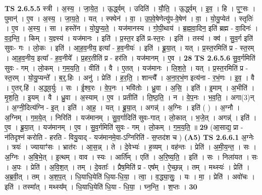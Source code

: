\documentclass[17pt]{extarticle}
\begin{document}
                  \newline
                                \textbf{ TS 2.6.5.5} \newline
                  स्त्री । अ॒स्य॒ । जा॒ये॒त॒ । ऊ॒र्द्ध्वम् । उदिति॑ । यौ॒ति॒ । ऊ॒र्द्ध्वम् । इ॒व॒ । हि । पुꣳ॒॒सः । पुमान्॑ । ए॒व । अ॒स्य॒ । जा॒य॒ते॒ । यत् । स्फ्येन॑ । वा॒ । उ॒प॒वे॒षेणेत्यु॑प-वे॒षेण॑ । वा॒ । यो॒यु॒प्येत॑ । स्तृतिः॑ । ए॒व । अ॒स्य॒ । सा । हस्ते॑न । यो॒यु॒प्य॒ते॒ । यज॑मानस्य । गो॒पी॒थाय॑ । ब्र॒ह्म॒वा॒दिन॒ इति॑ ब्रह्म - वा॒दिनः॑ । व॒द॒न्ति॒ । किम् । य॒ज्ञ्स्य॑ । यज॑मानः । इति॑ । प्र॒स्त॒र इति॑ प्र-स्त॒रः । इति॑ । तस्य॑ । क्व॑ । सु॒व॒र्ग इति॑ सुवः- गः । लो॒कः । इति॑ । आ॒ह॒व॒नीय॒ इत्या᳚ - ह॒व॒नीयः॑ । इति॑ । ब्रू॒या॒त् । यत् । प्र॒स्त॒रमिति॑ प्र - स्त॒रम् । आ॒ह॒व॒नीय॒ इत्या᳚ - ह॒व॒नीये᳚ । प्र॒हर॒तीति॑ प्र - हर॑ति । यज॑मानम् । ए॒व । \textbf{  28} \newline
                  \newline
                                \textbf{ TS 2.6.5.6} \newline
                  सु॒व॒र्गमिति॑ सुवः - गम् । लो॒कम् । ग॒म॒य॒ति॒ । वीति॑ । वै । ए॒तत् । यज॑मानः । लि॒श॒ते॒ । यत् । प्र॒स्त॒रमिति॑ प्र - स्त॒रम् । यो॒यु॒प्यन्ते᳚ । ब॒र्॒.हिः । अनु॑ । प्रेति॑ । ह॒र॒ति॒ । शान्त्यै᳚ । अ॒ना॒र॒भं॒ण इत्य॑ना - र॒भं॒णः । इ॒व॒ । वै । ए॒तर्.हि॑ । अ॒द्ध्व॒र्युः । सः । ई॒श्व॒रः । वे॒प॒नः । भवि॑तोः । ध्रु॒वा । अ॒सि॒ । इति॑ । इ॒माम् । अ॒भीति॑ । मृ॒श॒ति॒ । इ॒यम् । वै । ध्रु॒वा । अ॒स्याम् । ए॒व । प्रतीति॑ । ति॒ष्ठ॒ति॒ । न । वे॒प॒नः । भ॒व॒ति॒ । अगा(3)न् । अ॒ग्नी॒दित्य॑ग्नि - इ॒त् । इति॑ । आ॒ह॒ । यत् । ब्रू॒या॒त् । अगन्न्॑ । अ॒ग्निः । इति॑ ( ) । अ॒ग्नौ । अ॒ग्निम् । ग॒म॒ये॒त् । निरिति॑ । यज॑मानम् । सु॒व॒र्गादिति॑ सुवः-गात् । लो॒कात् । भ॒जे॒त् । अगन्न्॑ । इति॑ । ए॒व । ब्रू॒या॒त् । यज॑मानम् । ए॒व । सु॒व॒र्गमिति॑ सुवः - गम् । लो॒कम् । ग॒म॒य॒ति॒ ॥ \textbf{  29} \newline
                  \newline
                      (आ॒साद्य॒ प्रा - न॑तिदृश्नं करोति - हरति - वियु॒याद् - यज॑मानमे॒वा-ऽग्निरिति॑ - स॒प्तद॑श च )  \textbf{(A5)} \newline \newline
                                \textbf{ TS 2.6.6.1} \newline
                  अ॒ग्नेः । त्रयः॑ । ज्यायाꣳ॑सः । भ्रात॑रः । आ॒स॒न्न् । ते । दे॒वेभ्यः॑ । ह॒व्यम् । वह॑न्तः । प्रेति॑ । अ॒मी॒य॒न्त॒ । सः । अ॒ग्निः । अ॒बि॒भे॒त् । इ॒त्थम् । वाव । स्यः । आर्ति᳚म् । एति॑ । अ॒रि॒ष्य॒ति॒ । इति॑ । सः । निला॑यत । सः । अ॒पः । प्रेति॑ । अ॒वि॒श॒त् । तम् । दे॒वताः᳚ । प्रैष॒मिति॑ प्र - एष᳚म् । ऐ॒च्छ॒न्न् । तम् । मथ्स्यः॑ । प्रेति॑ । अ॒ब्र॒वी॒त् । तम् । अ॒श॒प॒त् । धि॒याधि॒येति॑ धि॒या-धि॒या॒ । त्वा॒ । व॒द्ध्या॒सुः॒ । यः । मा॒ । प्रेति॑ । अवो॑चः । इति॑ । तस्मा᳚त् । मथ्स्य᳚म् । धि॒याधि॒येति॑ धि॒या - धि॒या॒ । घ्न॒न्ति॒ । श॒प्तः । \textbf{  30} \newline
\end{document}
